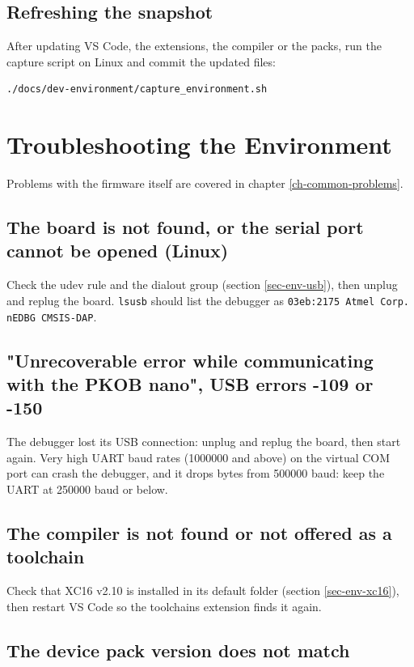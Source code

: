 \documentclass[
  11pt,
  letterpaper,
  oneside,
  DIV=13,               %
  parskip=half,          %
  headings=normal,
  chapterprefix=false,
  toc=listof,
  numbers=noenddot,
]{scrbook}
\begin{document}
\section{Refreshing the snapshot}

After updating VS Code, the extensions, the compiler or the packs, run the capture script on Linux and commit the updated files:
\begin{lstlisting}[style=shell]
./docs/dev-environment/capture_environment.sh
\end{lstlisting}

\chapter{Troubleshooting the Environment}\label{ch-env-trouble}

Problems with the firmware itself are covered in chapter \ref{ch-common-problems}.

\section{The board is not found, or the serial port cannot be opened (Linux)}

Check the udev rule and the dialout group (section \ref{sec-env-usb}), then unplug and replug the board. \texttt{lsusb} should list the debugger as \texttt{03eb:2175 Atmel Corp.\allowbreak{} nEDBG CMSIS-\allowbreak{}DAP}.

\section{"Unrecoverable error while communicating with the PKOB nano", USB errors -109 or -150}

The debugger lost its USB connection: unplug and replug the board, then start again. Very high UART baud rates (1000000 and above) on the virtual COM port can crash the debugger, and it drops bytes from 500000 baud: keep the UART at 250000 baud or below.

\section{The compiler is not found or not offered as a toolchain}

Check that XC16 v2.10 is installed in its default folder (section \ref{sec-env-xc16}), then restart VS Code so the toolchains extension finds it again.

\section{The device pack version does not match}
\end{document}
